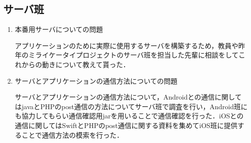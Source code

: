 \subsection{サーバ班}
\begin{enumerate}
\item 本番用サーバについての問題
\par
アプリケーションのために実際に使用するサーバを構築するため，教員や昨年のミライケータイプロジェクトのサーバ班を担当した先輩に相談をしてこれからの動きについて教えて貰った．
\item サーバとアプリケーションの通信方法についての問題
\par
サーバとアプリケーションの通信方法について，Androidとの通信に関してはjavaとPHPのpost通信の方法についてサーバ班で調査を行い，Android班にも協力してもらい通信確認用jarを用いることで通信確認を行った．iOSとの通信に関してはSwiftとPHPのpost通信に関する資料を集めてiOS班に提供することで通信方法の模索を行った．
\end{enumerate}
